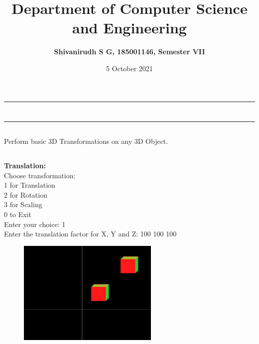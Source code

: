 \documentclass[9pt,letterpaper]{article}
\title{\textbf{Department of Computer Science and Engineering}}
\author{\textbf{Shivanirudh S G, 185001146, Semester VII }}
\date{5 October 2021}
\begin{document}
\maketitle
\hrule
\section*{}
\hrule 
\bigskip\bigskip

\subsection*{}

\subsection*{}
\begin{flushleft}
    Perform basic 3D Transformations on any 3D Object.
\end{flushleft}

\subsection*{}
\begin{flushleft}




\end{flushleft}
\newpage
\subsection*{}
\textbf{Translation:}\\

Choose transformation: \\
1 for Translation      \\
2 for Rotation         \\
3 for Scaling          \\
0 to Exit              \\
Enter your choice: 1   \\
Enter the translation factor for X, Y and Z: 100 100 100  \\

\begin{figure}[h]
    \centering
    \includegraphics[height=5cm]{Outputs/OP1.png}
\end{figure}
\end{document}
